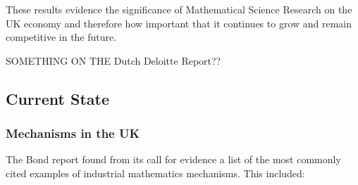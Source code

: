 \documentclass[11pt]{article} %
\begin{document}
 These results evidence the significance of Mathematical Science Research on the UK economy and therefore how important that it continues to grow and remain competitive in the future. 
 
 
	
	SOMETHING ON THE Dutch Deloitte Report??
	
	 
	\subsection{Current State }
	
	\subsubsection{ Mechanisms in the UK  }
	
	The Bond report \cite{Bond} found from its call for evidence a list of the most commonly cited examples of industrial mathematics mechanisms. This included: 
\end{document}
